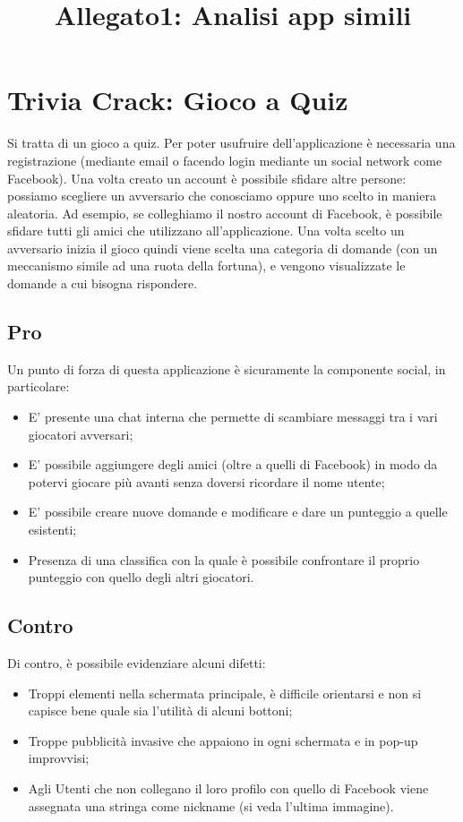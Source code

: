 \documentclass{article}
\title{\textbf{Allegato1: Analisi app simili}}
\date{}
\begin{document}
\maketitle
\tableofcontents
\newpage

\section{Trivia Crack: Gioco a Quiz}
Si tratta di un gioco a quiz. Per poter usufruire dell’applicazione è necessaria una registrazione (mediante email o facendo login mediante un social network come Facebook). Una volta creato un account è possibile sfidare altre persone: possiamo scegliere un avversario che conosciamo oppure uno scelto in maniera aleatoria. Ad esempio, se colleghiamo il nostro account di Facebook, è possibile sfidare tutti gli amici che utilizzano all’applicazione. Una volta scelto un avversario inizia il gioco quindi viene scelta una categoria di domande (con un meccanismo simile ad una ruota della fortuna), e vengono visualizzate le domande a cui bisogna rispondere.

\subsection{Pro}
Un punto di forza di questa applicazione è sicuramente la componente social, in particolare:
\begin{itemize}
\item E’ presente una chat interna che permette di scambiare messaggi tra i vari giocatori avversari;
\item E’ possibile aggiungere degli amici (oltre a quelli di Facebook) in modo da potervi giocare più avanti senza doversi ricordare il nome utente;
\item E’ possibile creare nuove domande e modificare e dare un punteggio a quelle esistenti;
\item Presenza di una classifica con la quale è possibile confrontare il proprio punteggio con quello degli altri giocatori.
\end{itemize}

\subsection{Contro}
Di contro, è possibile evidenziare alcuni difetti:
\begin{itemize}
\item Troppi elementi nella schermata principale, è difficile orientarsi e non si capisce bene quale sia l’utilità di alcuni bottoni;
\item Troppe pubblicità invasive che appaiono in ogni schermata e in pop-up improvvisi;
\item Agli Utenti che non collegano il loro profilo con quello di Facebook viene assegnata una stringa come nickname (si veda l’ultima immagine).
\end{itemize}
\end{document}
